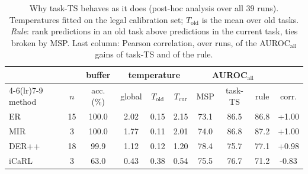 \begin{table}[t]\centering\small
\caption{Why task-TS behaves as it does (post-hoc analysis over all 39 runs). Temperatures fitted on the legal calibration set; $T_\mathrm{old}$ is the mean over old tasks. \emph{Rule}: rank predictions in an old task above predictions in the current task, ties broken by MSP. Last column: Pearson correlation, over runs, of the AUROC$_\mathrm{all}$ gains of task-TS and of the rule.}\label{tab:mech}
\begin{tabular}{lc c ccc ccc c}\toprule
 & & buffer & \multicolumn{3}{c}{temperature} & \multicolumn{3}{c}{AUROC$_\mathrm{all}$} & \\
\cmidrule(lr){4-6}\cmidrule(lr){7-9}
method & $n$ & acc. (\%) & global & $T_\mathrm{old}$ & $T_\mathrm{cur}$ & MSP & task-TS & rule & corr.\\\midrule
ER & 15 & 100.0 & 2.02 & 0.15 & 2.15 & 73.1 & 86.5 & 86.8 & +1.00\\
MIR & 3 & 100.0 & 1.77 & 0.11 & 2.01 & 74.0 & 86.8 & 87.2 & +1.00\\
DER++ & 18 & 99.9 & 1.12 & 0.12 & 1.20 & 78.4 & 75.7 & 77.1 & +0.98\\
iCaRL & 3 & 63.0 & 0.43 & 0.38 & 0.54 & 75.5 & 76.7 & 71.2 & -0.83\\
\bottomrule\end{tabular}
\end{table}
